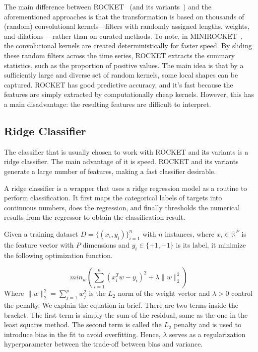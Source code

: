 The main difference between ROCKET~\cite{dempster2020rocket} (and its variants~\cite{dempster2021minirocket, tan2022multirocket, dempster2023hydra}) and the aforementioned approaches is that the transformation is based on thousands of (random) convolutional kernels—filters with randomly assigned lengths, weights, and dilations —rather than on curated methods.
To note, in MINIROCKET~\cite{dempster2021minirocket}, the convolutional kernels are created deterministically for faster speed.
By sliding these random filters across the time series, ROCKET extracts the summary statistics, such as the proportion of positive values.
The main idea is that by a sufficiently large and diverse set of random kernels, some local shapes can be captured.
ROCKET has good predictive accuracy, and it's fast because the features are simply extracted by computationally cheap kernels.
However, this has a main disadvantage: the resulting features are difficult to interpret.

\subsection{Ridge Classifier} %

The classifier that is usually chosen to work with ROCKET and its variants is a ridge classifier. The main advantage of it is speed. ROCKET and its variants generate a large number of features, making a fast classifier desirable.

A ridge classifier is a wrapper that uses a ridge regression model as a routine to perform classification. It first maps the categorical labels of targets into continuous numbers, does the regression, and finally thresholds the numerical results from the regressor to obtain the classification result.

Given a training dataset $D = \{(x_i, y_i)\}_{i=1}^n$ with $n$ instances, where $x_i \in \mathbb{R}^P$ is the feature vector with $P$ dimensions and $y_i \in \{+1, -1\}$ is its label, it minimize the following optimization function.

\begin{equation}
min_{w} \left( \sum_{i=1}^n (x_i^T w - y_i)^2 + \lambda \|w\|_2^2 \right)
\end{equation}
Where $\|w\|_2^2 = \sum_{j=1}^p w_j^2$ is the $L_2$ norm of the weight vector and $\lambda > 0$ control the penalty.
We explain the equation in brief. There are two terms inside the bracket. The first term is simply the sum of the residual, same as the one in the least squares method. The second term is called the $L_2$ penalty and is used to introduce bias in the fit to avoid overfitting. Hence, $\lambda$ serves as a regularization hyperparameter between the trade-off between bias and variance.

